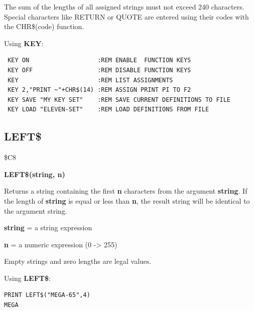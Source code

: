 \begin{description}[leftmargin=2cm,style=nextline]
\item [Remarks:] The sum of the lengths of all assigned strings
                 must not exceed 240 characters.
                 Special characters like RETURN or QUOTE are entered
                 using their codes with the CHR\$(code) function.
\item [Example:] Using {\bf KEY}:
\begin{tcolorbox}[colback=black,coltext=white]
\verbatimfont{\codefont}
\begin{verbatim}
 KEY ON                   :REM ENABLE  FUNCTION KEYS
 KEY OFF                  :REM DISABLE FUNCTION KEYS
 KEY                      :REM LIST ASSIGNMENTS
 KEY 2,"PRINT ~"+CHR$(14) :REM ASSIGN PRINT PI TO F2
 KEY SAVE "MY KEY SET"    :REM SAVE CURRENT DEFINITIONS TO FILE
 KEY LOAD "ELEVEN-SET"    :REM LOAD DEFINITIONS FROM FILE
\end{verbatim}
\end{tcolorbox}
\end{description}


\newpage
\subsection{LEFT\$}
\begin{description}[leftmargin=2cm,style=nextline]
\item [Token:] \$C8
\item [Format:] {\bf LEFT\$(string, n)}
\item [Usage:] Returns a string
               containing the first {\bf n} characters from the
               argument {\bf string}.
               If the length of {\bf string} is equal or less than {\bf n},
               the result string will be identical to the argument string.

               {\bf string} = a string expression

               {\bf n} = a numeric expression (0 -> 255)

\item [Remarks:] Empty strings and zero lengths are legal values.

\item [Example:] Using {\bf LEFT\$}:
\begin{tcolorbox}[colback=black,coltext=white]
\verbatimfont{\codefont}
\begin{verbatim}
PRINT LEFT$("MEGA-65",4)
MEGA
\end{verbatim}
\end{tcolorbox}
\end{description}

